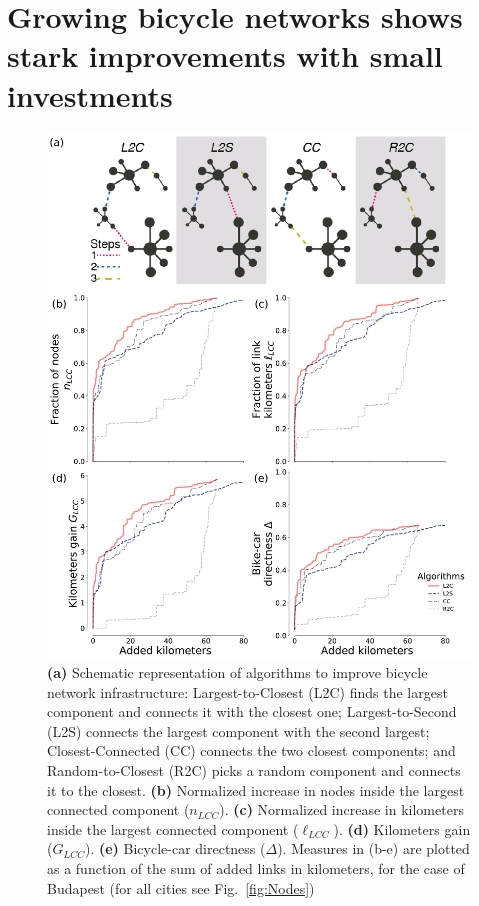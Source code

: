 \section{Growing bicycle networks shows stark improvements with small investments}

\begin{figure}[htbp]
  \centering
  \includegraphics[width=\textwidth]{images/datadriven/Fig03.pdf}
  \caption[Algorithms improvement]{\textbf{(a)} Schematic representation of algorithms to improve bicycle network infrastructure: Largest-to-Closest (L2C) finds the largest component and connects it with the closest one; Largest-to-Second (L2S) connects the largest component with the second largest; Closest-Connected (CC) connects the two closest components; and Random-to-Closest (R2C) picks a random component and connects it to the closest. \textbf{(b)} Normalized increase in nodes inside the largest connected component ($n_{LCC}$). \textbf{(c)} Normalized increase in kilometers inside the largest connected component ($\ell_{LCC}$). \textbf{(d)} Kilometers gain ($G_{LCC}$). \textbf{(e)} Bicycle-car directness ($\Delta$). Measures in (b-e) are plotted as a function of the sum of added links in kilometers, for the case of Budapest (for all cities see Fig.~\ref{fig:Nodes})}
  \label{fig:Algorithms}
\end{figure}

